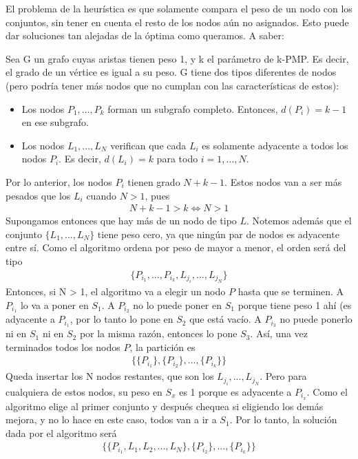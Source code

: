 El problema de la heurística es que solamente compara el peso de un nodo con los conjuntos, sin tener en cuenta el resto de los nodos aún no asignados. Esto puede dar soluciones tan alejadas de la óptima como queramos. A saber:

Sea G un grafo cuyas aristas tienen peso 1, y k el parámetro de k-PMP. Es decir, el grado de un vértice es igual a su peso. G tiene dos tipos diferentes de nodos (pero podría tener más nodos que no cumplan con las características de estos):
\begin{itemize}
    \item Los nodos $P_1, ..., P_k$ forman un subgrafo completo. Entonces, $d(P_i) = k-1$ en ese subgrafo.
    \item Los nodos $L_1, ..., L_N$ verifican que cada $L_i$ es solamente adyacente a todos los nodos $P_i$. Es decir, $d(L_i) = k$ para todo $i = 1, ..., N$.
\end{itemize}
Por lo anterior, los nodos $P_i$ tienen grado $N+k-1$. Estos nodos van a ser más pesados que los $L_i$ cuando $N > 1$, pues 
\begin{align*}
N+k-1 > k \Longleftrightarrow N > 1
\end{align*}
Supongamos entonces que hay más de un nodo de tipo $L$. Notemos además que el conjunto $\{L_1, ..., L_N\}$ tiene peso cero, ya que ningún par de nodos es adyacente entre sí.
Como el algoritmo ordena por peso de mayor a menor, el orden será del tipo 
\begin{align*}
\{P_{i_1},...,P_{i_k},L_{j_i},...,L_{j_N}\}
\end{align*}
Entonces, si N > 1, el algoritmo va a elegir un nodo $P$ hasta que se terminen. A $P_{i_1}$ lo va a poner en $S_1$. A $P_{i_2}$ no lo puede poner en $S_1$ porque tiene peso 1 ahí (es adyacente a $P_{i_1}$, por lo tanto lo pone en $S_2$ que está vacío. A $P_{i_3}$ no puede ponerlo ni en $S_1$ ni en $S_2$ por la misma razón, entonces lo pone $S_3$. Así, una vez terminados todos los nodos $P$, la partición es
\begin{align*}
\{\{P_{i_1}\},\{P_{i_2}\},...,\{P_{i_k}\}\}
\end{align*}
Queda insertar los N nodos restantes, que son los $L_{j_i},...,L_{j_N}$. Pero para cualquiera de estos nodos, su peso en $S_x$ es 1 porque es adyacente a $P_{i_x}$. Como el algoritmo elige al primer conjunto y después chequea si eligiendo los demás mejora, y no lo hace en este caso, todos van a ir a $S_1$. Por lo tanto, la solución dada por el algoritmo será
\begin{align*}
\{ \{P_{i_1}, L_1, L_2, ..., L_N\}, \{P_{i_2}\}, ..., \{P_{i_k}\} \}
\end{align*}
